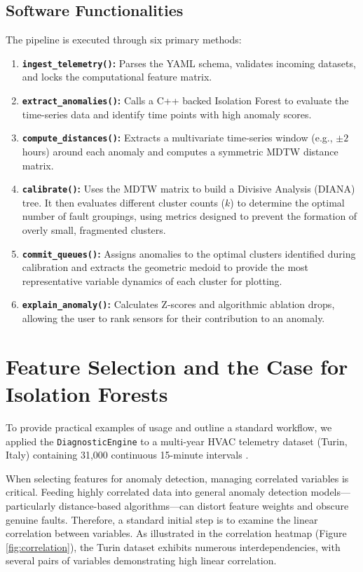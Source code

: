 \documentclass[final,3p,times]{elsarticle}
\begin{document}
\subsection{Software Functionalities}
The pipeline is executed through six primary methods:
\begin{enumerate}
\item \textbf{\texttt{ingest\_telemetry()}:} Parses the YAML schema, validates incoming datasets, and locks the computational feature matrix.
\item \textbf{\texttt{extract\_anomalies()}:} Calls a C++ backed Isolation Forest to evaluate the time-series data and identify time points with high anomaly scores.
\item \textbf{\texttt{compute\_distances()}:} Extracts a multivariate time-series window (e.g., $\pm 2$ hours) around each anomaly and computes a symmetric MDTW distance matrix.
\item \textbf{\texttt{calibrate()}:} Uses the MDTW matrix to build a Divisive Analysis (DIANA) tree. It then evaluates different cluster counts ($k$) to determine the optimal number of fault groupings, using metrics designed to prevent the formation of overly small, fragmented clusters.
\item \textbf{\texttt{commit\_queues()}:} Assigns anomalies to the optimal clusters identified during calibration and extracts the geometric medoid to provide the most representative variable dynamics of each cluster for plotting.
\item \textbf{\texttt{explain\_anomaly()}:} Calculates Z-scores and algorithmic ablation drops, allowing the user to rank sensors for their contribution to an anomaly.
\end{enumerate}


\section{Feature Selection and the Case for Isolation Forests}

To provide practical examples of usage and outline a standard workflow, we applied the \texttt{DiagnosticEngine} to a multi-year HVAC telemetry dataset (Turin, Italy) containing 31,000 continuous 15-minute intervals \cite{borda2022development}.

When selecting features for anomaly detection, managing correlated variables is critical. Feeding highly correlated data into general anomaly detection models—particularly distance-based algorithms—can distort feature weights and obscure genuine faults. Therefore, a standard initial step is to examine the linear correlation between variables. As illustrated in the correlation heatmap (Figure \ref{fig:correlation}), the Turin dataset exhibits numerous interdependencies, with several pairs of variables demonstrating high linear correlation.
\end{document}
